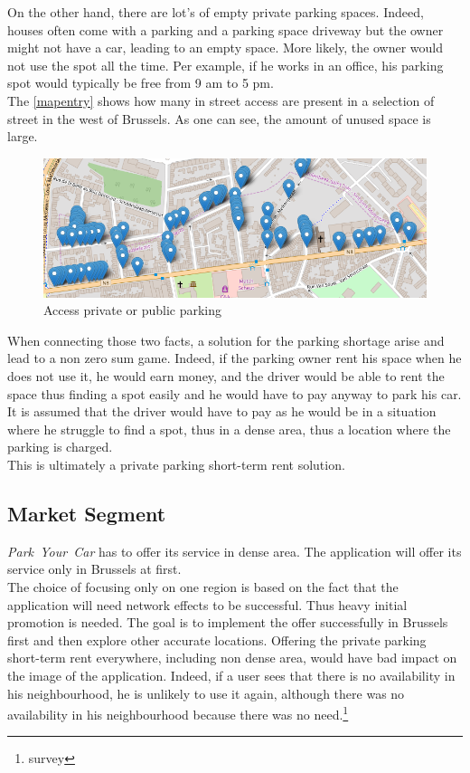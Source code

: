 \documentclass[12pt,a4paper,oneside]{book}
\newcommand{\bp}{\textit{Park~Your~Car }}
\begin{document}
On the other hand, there are lot's of empty private parking spaces. Indeed, houses often come with a parking and a parking space driveway but the owner might not have a car, leading to an empty space. More likely, the owner would not use the spot all the time. Per example, if he works in an office, his parking spot would typically be free from 9 am to 5 pm.\\
The \autoref{mapentry} shows how many in street access are present in a selection of street in the west of Brussels. As one can see, the amount of unused space is large.\\


\begin{figure}[h]
\centering
\caption{Access private or public parking\cite{mapentrysrc}}
\label{mapentry}
\includegraphics[keepaspectratio=true,width=\textwidth-2cm]{images/casestudyander.png}
\end{figure}

When connecting those two facts, a solution for the parking shortage arise and lead to a non zero sum game. Indeed, if the parking owner rent his space when he does not use it, he would earn money, and the driver would be able to rent the space thus finding a spot easily and he would have to pay anyway to park his car. It is assumed that the driver would have to pay as he would be in a situation where he struggle to find a spot, thus in a dense area, thus a location where the parking is charged.\\

This is ultimately a private parking short-term rent solution.

\subsection{Market Segment}
\bp has to offer its service in dense area. The application will offer its service only in Brussels at first.\\

The choice of focusing only on one region is based on the fact that the application will need network effects to be successful. Thus heavy initial promotion is needed. The goal is to implement the offer successfully in Brussels first and then explore other accurate locations. Offering the private parking short-term rent everywhere, including non dense area, would have bad impact on the image of the application. Indeed, if a user sees that there is no availability in his neighbourhood, he is unlikely to use it again, although there was no availability in his neighbourhood because there was no need.\footnote{survey} \\
\end{document}
